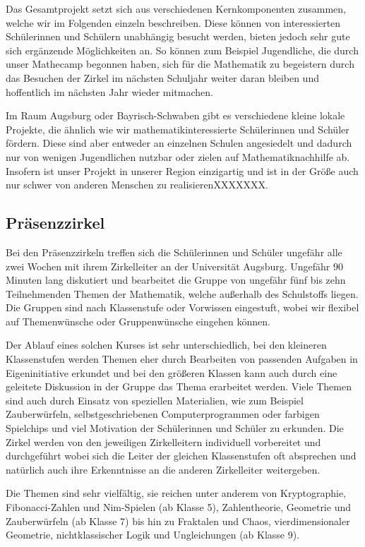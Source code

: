 \documentclass[12pt]{zettel}
\begin{document}
Das Gesamtprojekt setzt sich aus verschiedenen Kernkomponenten zusammen,
welche wir im Folgenden einzeln beschreiben. Diese können von
interessierten Schülerinnen und Schülern unabhängig besucht werden,
bieten jedoch sehr gute sich ergänzende Möglichkeiten an. So können zum
Beispiel Jugendliche, die durch unser Mathecamp begonnen haben, sich für
die Mathematik zu begeistern durch das Besuchen der Zirkel im nächsten
Schuljahr weiter daran bleiben und hoffentlich im nächsten Jahr wieder
mitmachen.

Im Raum Augsburg oder Bayrisch-Schwaben gibt es verschiedene kleine
lokale Projekte, die ähnlich wie wir mathematikinteressierte
Schülerinnen und Schüler fördern. Diese sind aber entweder an einzelnen
Schulen angesiedelt und dadurch nur von wenigen Jugendlichen nutzbar
oder zielen auf Mathematiknachhilfe ab. Insofern ist unser Projekt in
unserer Region einzigartig und ist in der Größe auch nur schwer von
anderen Menschen zu realisierenXXXXXXX.

\subsection{Präsenzzirkel}

Bei den Präsenzzirkeln treffen sich die Schülerinnen und Schüler
ungefähr alle zwei Wochen mit ihrem Zirkelleiter an der Universität
Augsburg. Ungefähr 90 Minuten lang diskutiert und bearbeitet die Gruppe
von ungefähr fünf bis zehn Teilnehmenden Themen der Mathematik, welche
außerhalb des Schulstoffs liegen. Die Gruppen sind nach Klassenstufe
oder Vorwissen eingestuft, wobei wir flexibel auf Themenwünsche oder
Gruppenwünsche eingehen können.

Der Ablauf eines solchen Kurses ist sehr unterschiedlich, bei den
kleineren Klassenstufen werden Themen eher durch Bearbeiten von
passenden Aufgaben in Eigeninitiative erkundet und bei den größeren
Klassen kann auch durch eine geleitete Diskussion in der Gruppe das
Thema erarbeitet werden. Viele Themen sind auch durch Einsatz von
speziellen Materialien, wie zum Beispiel Zauberwürfeln,
selbstgeschriebenen Computerprogrammen oder farbigen Spielchips und viel
Motivation der Schülerinnen und Schüler zu erkunden. Die Zirkel werden
von den jeweiligen Zirkelleitern individuell vorbereitet und
durchgeführt wobei sich die Leiter der gleichen Klassenstufen oft
absprechen und natürlich auch ihre Erkenntnisse an die anderen
Zirkelleiter weitergeben.

Die Themen sind sehr vielfältig, sie reichen unter anderem von
Kryptographie, Fibonacci-Zahlen und Nim-Spielen (ab Klasse 5),
Zahlentheorie, Geometrie und Zauberwürfeln (ab Klasse 7) bis hin zu
Fraktalen und Chaos, vierdimensionaler Geometrie, nichtklassischer Logik
und Ungleichungen (ab Klasse 9).
\end{document}
